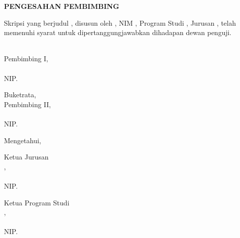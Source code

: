 \newpage
{}
\begin{center}
    \begin{doublespace}
        \textbf{\large PENGESAHAN PEMBIMBING}
    \end{doublespace}
    \vspace{1cm}
\end{center}

\noindent Skripsi yang berjudul {\judulid}, disusun oleh {\penulis}, NIM {\nim}, Program Studi {\prodi}, Jurusan {\fakultas} {\universitas}, telah memenuhi syarat untuk dipertanggungjawabkan dihadapan dewan penguji.

\vspace{1.5cm}

\noindent\begin{minipage}[t]{0.48\textwidth}
    \centering
    \phantom{Buketrata, \tglpersetujuan}\\
    Pembimbing I,\\[2cm]
    \textbf{\pembimbingI}\\
    NIP. \NIPpembimbingI
\end{minipage}
\hfill
\begin{minipage}[t]{0.48\textwidth}
    \centering
    Buketrata, \tglpersetujuan\\
    Pembimbing II,\\[2cm]
    \textbf{\pembimbingII}\\
    NIP. \NIPpembimbingII
\end{minipage}

\vspace{2cm}

\begin{center}
    Mengetahui,
\end{center}

\vspace{0.5cm}

\noindent\begin{minipage}[t]{0.48\textwidth}
    \centering
    Ketua Jurusan\\
    \fakultas,\\[2cm]
    \textbf{\kajur}\\
    NIP. \NIPkajur
\end{minipage}
\hfill
\begin{minipage}[t]{0.48\textwidth}
    \centering
    Ketua Program Studi\\
    \prodi,\\[2cm]
    \textbf{\koorprodi}\\
    NIP. \NIPkoorprodi
\end{minipage}

